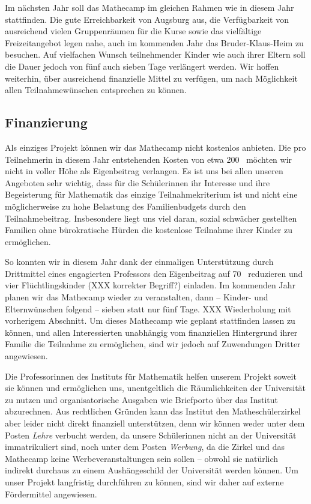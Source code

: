 \documentclass[12pt]{zettel}
\begin{document}
Im nächsten Jahr soll das Mathecamp im gleichen Rahmen wie in diesem Jahr stattfinden. Die gute Erreichbarkeit von Augsburg aus, die Verfügbarkeit von ausreichend vielen
Gruppenräumen für die Kurse sowie das vielfältige Freizeitangebot legen nahe, auch im kommenden Jahr das Bruder-Klaus-Heim zu besuchen. Auf vielfachen Wunsch teilnehmender Kinder wie
auch ihrer Eltern soll die Dauer jedoch von fünf auch sieben Tage verlängert werden. Wir hoffen weiterhin, über ausreichend finanzielle Mittel zu verfügen, um nach Möglichkeit allen
Teilnahmewünschen entsprechen zu können.

\subsection{Finanzierung}

Als einziges Projekt können wir das Mathecamp nicht kostenlos anbieten. Die pro Teilnehmerin in diesem
Jahr entstehenden Kosten von etwa 200~\texteuro{} möchten wir nicht in voller Höhe als Eigenbeitrag verlangen. Es ist uns bei allen unseren Angeboten sehr wichtig, dass für die
Schülerinnen ihr Interesse und ihre Begeisterung für Mathematik das einzige Teilnahmekriterium ist und nicht eine möglicherweise zu hohe Belastung des Familienbudgets durch den
Teilnahmebeitrag. Insbesondere liegt uns viel daran, sozial schwächer gestellten Familien ohne bürokratische Hürden die kostenlose Teilnahme ihrer Kinder zu ermöglichen.

So konnten wir in diesem Jahr dank der einmaligen Unterstützung durch Drittmittel eines engagierten Professors den Eigenbeitrag auf 70~\texteuro{} reduzieren und vier Flüchtlingskinder (XXX korrekter Begriff?) einladen.
Im kommenden Jahr planen wir das Mathecamp wieder zu veranstalten, dann -- Kinder- und Elternwünschen folgend -- sieben statt nur fünf Tage. XXX Wiederholung mit vorherigem Abschnitt. Um dieses Mathecamp wie geplant
stattfinden lassen zu können, und allen Interessierten unabhängig vom finanziellen Hintergrund ihrer Familie die Teilnahme zu ermöglichen, sind wir jedoch auf Zuwendungen
Dritter angewiesen.

Die Professorinnen des Instituts für Mathematik helfen unserem Projekt soweit sie können
und ermöglichen uns, unentgeltlich die Räumlichkeiten der Universität zu nutzen
und organisatorische Ausgaben wie Briefporto über das Institut abzurechnen.
Aus rechtlichen Gründen kann das Institut den Matheschülerzirkel aber leider nicht
direkt finanziell unterstützen, denn wir können weder unter dem Posten
\emph{Lehre} verbucht werden, da unsere Schülerinnen nicht an der Universität
immatrikuliert sind, noch unter dem Posten \emph{Werbung}, da die Zirkel und
das Mathecamp keine Werbeveranstaltungen sein sollen -- obwohl sie natürlich indirekt
durchaus zu einem Aushängeschild der Universität werden können.
Um unser Projekt langfristig durchführen zu können, sind wir daher auf externe
Fördermittel angewiesen.
\end{document}
